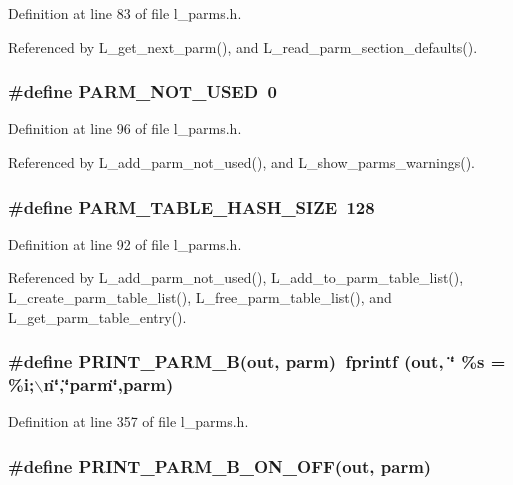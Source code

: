 Definition at line 83 of file l\_\-parms.h.

Referenced by L\_\-get\_\-next\_\-parm(), and L\_\-read\_\-parm\_\-section\_\-defaults().
\subsubsection{\setlength{\rightskip}{0pt plus 5cm}\#define PARM\_\-NOT\_\-USED~0}\label{l__parms_8h_124b3df70211e9e1956574e7039ebbec}




Definition at line 96 of file l\_\-parms.h.

Referenced by L\_\-add\_\-parm\_\-not\_\-used(), and L\_\-show\_\-parms\_\-warnings().
\subsubsection{\setlength{\rightskip}{0pt plus 5cm}\#define PARM\_\-TABLE\_\-HASH\_\-SIZE~128}\label{l__parms_8h_36215e82184d0149f0657606c862cabc}




Definition at line 92 of file l\_\-parms.h.

Referenced by L\_\-add\_\-parm\_\-not\_\-used(), L\_\-add\_\-to\_\-parm\_\-table\_\-list(), L\_\-create\_\-parm\_\-table\_\-list(), L\_\-free\_\-parm\_\-table\_\-list(), and L\_\-get\_\-parm\_\-table\_\-entry().
\subsubsection{\setlength{\rightskip}{0pt plus 5cm}\#define PRINT\_\-PARM\_\-B(out, parm)~fprintf (out, \char`\"{}    \%s = \%i;$\backslash$n\char`\"{},\char`\"{}parm\char`\"{},parm)}\label{l__parms_8h_b6597fad69f9a6de65ddc5869f4ed631}




Definition at line 357 of file l\_\-parms.h.
\subsubsection{\setlength{\rightskip}{0pt plus 5cm}\#define PRINT\_\-PARM\_\-B\_\-ON\_\-OFF(out, parm)}\label{l__parms_8h_73e39d20faadca0117afd4b7dfaf9c69}



